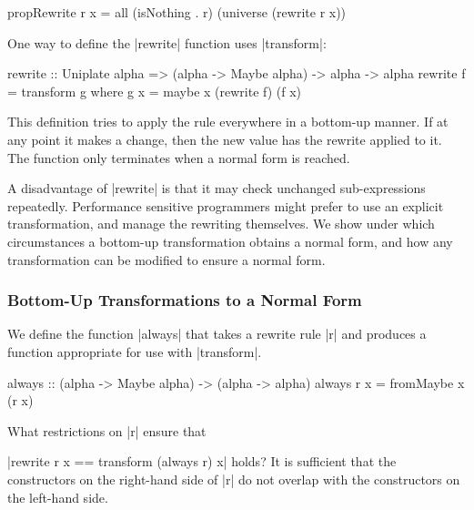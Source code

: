 \begin{code}
propRewrite r x = all (isNothing . r) (universe (rewrite r x))
\end{code}

One way to define the |rewrite| function uses |transform|:

\begin{code}
rewrite :: Uniplate alpha => (alpha -> Maybe alpha) -> alpha -> alpha
rewrite f = transform g
    where g x = maybe x (rewrite f) (f x)
\end{code}

This definition tries to apply the rule everywhere in a bottom-up manner. If at any point it makes a change, then the new value has the rewrite applied to it. The function only terminates when a normal form is reached.

A disadvantage of |rewrite| is that it may check unchanged sub-expressions repeatedly. Performance sensitive programmers might prefer to use an explicit transformation, and manage the rewriting themselves. We show under which circumstances a bottom-up transformation obtains a normal form, and how any transformation can be modified to ensure a normal form.

\subsubsection{Bottom-Up Transformations to a Normal Form}
\label{secU:rewrite_bottom}

We define the function |always| that takes a rewrite rule |r| and produces a function appropriate for use with |transform|.

\begin{code}
always :: (alpha -> Maybe alpha) -> (alpha -> alpha)
always r x = fromMaybe x (r x)
\end{code}

What restrictions on |r| ensure that \ignore|rewrite r x == transform (always r) x| holds? It is sufficient that the constructors on the right-hand side of |r| do not overlap with the constructors on the left-hand side.

